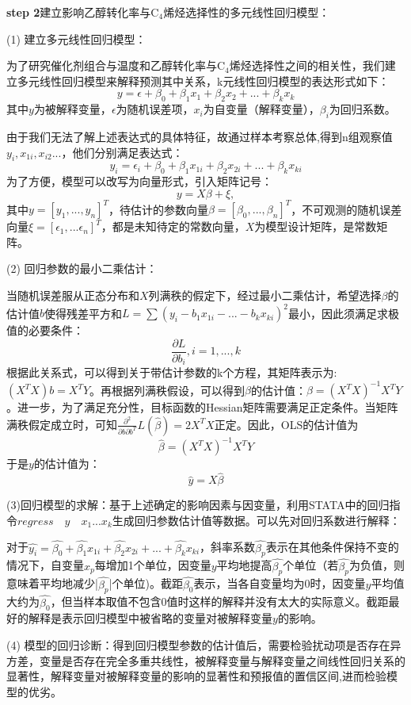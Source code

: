 \documentclass[a4paper,10.5pt]{ctexart}
\begin{document}
\par \textbf{step 2}建立影响乙醇转化率与C$_4$烯烃选择性的多元线性回归模型：
\par (1) 建立多元线性回归模型：
\par 为了研究催化剂组合与温度和乙醇转化率与C$_4$烯烃选择性之间的相关性，我们建立多元线性回归模型来解释预测其中关系\cite{book1}，k元线性回归模型的表达形式如下：
$$y=\epsilon+\beta_0+\beta_1x_1+\beta_2x_2+...+\beta_kx_k$$
其中$y$为被解释变量，$\epsilon$为随机误差项，$x_i$为自变量（解释变量），$\beta_i$为回归系数。
\par 由于我们无法了解上述表达式的具体特征，故通过样本考察总体,得到n组观察值$y_i,x_{1i},x_{i2}...$，他们分别满足表达式：
$$y_i=\epsilon_i+\beta_0+\beta_1x_{1i}+\beta_2x_{2i}+...+\beta_kx_{ki}$$
为了方便，模型可以改写为向量形式，引入矩阵记号：
$$y=X\beta+\xi,$$
其中$y=\left[y_1,...,y_n\right]^{T}$，待估计的参数向量$\beta=\left[\beta_0,...,\beta_n\right]^{T}$，不可观测的随机误差向量$\xi=\left[\epsilon_1,...\epsilon_n\right]^{T}$，都是未知待定的常数向量，$X$为模型设计矩阵，是常数矩阵。
\par (2) 回归参数的最小二乘估计：
\par 当随机误差服从正态分布和$X$列满秩的假定下，经过最小二乘估计，希望选择$\beta$的估计值$b$使得残差平方和$L=\sum(y_i-b_1x_{1i}-...-b_kx_{ki})^2$最小，因此须满足求极值的必要条件：$$\frac{\partial L}{\partial b_i}, i=1,...,k$$根据此关系式，可以得到关于带估计参数的k个方程，其矩阵表示为:$(X^{T}X)b=X^{T}Y$。再根据列满秩假设，可以得到$\beta$的估计值：$\hat{\beta}=(X^{T}X)^{-1}X^{T}Y$。进一步，为了满足充分性，目标函数的Hessian矩阵需要满足正定条件。当矩阵满秩假定成立时，可知$\frac{\partial^2}{\partial b\partial b^{T}}L(\hat{\beta})=2 X^{T}X$正定。因此，OLS的估计值为$$\hat{\beta}=(X^{T}X)^{-1}X^{T}Y$$于是$y$的估计值为：$$\hat{y}=X\hat{\beta}$$
\par (3)回归模型的求解：基于上述确定的影响因素与因变量，利用STATA中的回归指令$regress\quad y\quad x_1 ... x_k$生成回归参数估计值等数据。可以先对回归系数进行解释：
\par 对于$\hat{y_i}=\hat{\beta_0}+\hat{\beta_1}x_{1i}+\hat{\beta_2}x_{2i}+...+\hat{\beta_k}x_{ki}$，斜率系数$\hat{\beta_p}$表示在其他条件保持不变的情况下，自变量$x_p$每增加1个单位，因变量$y$平均地提高$\hat{\beta_p}$个单位（若$\hat{\beta_p}$为负值，则意味着平均地减少|$\hat{\beta_p}$|个单位)。截距$\hat{\beta_0}$表示，当各自变量均为0时，因变量$y$平均值大约为$\hat{\beta_0}$，但当样本取值不包含0值时这样的解释并没有太大的实际意义。截距最好的解释是表示回归模型中被省略的变量对被解释变量$y$的影响。
\par (4)  模型的回归诊断：得到回归模型参数的估计值后，需要检验扰动项是否存在异方差，变量是否存在完全多重共线性，被解释变量与解释变量之间线性回归关系的显著性，解释变量对被解释变量的影响的显著性和预报值的置信区间,进而检验模型的优劣。
\end{document}
